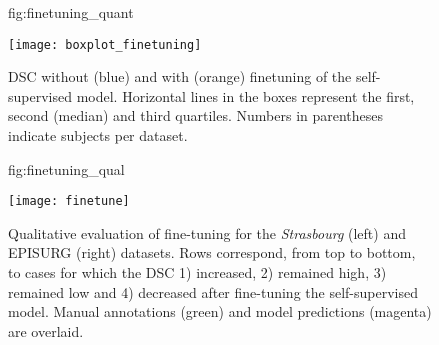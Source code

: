 

\begin{figure}
    \centering
    \floatconts
    {fig:finetuning_quant}
    {\caption{%
        \ac{DSC} without (blue) and with (orange) finetuning of the self-supervised model.
        Horizontal lines in the boxes represent the first, second (median) and third quartiles.
        Numbers in parentheses indicate subjects per dataset.
    }}
    {\texttt{[image: boxplot\_finetuning]}}
\end{figure}


\begin{figure}[ht!]
    \centering
    \floatconts
    {fig:finetuning_qual}
    {\caption{%
        Qualitative evaluation of fine-tuning for the \textit{Strasbourg} (left) and EPISURG (right) datasets.
        Rows correspond, from top to bottom, to cases for which the \ac{DSC}
        1) increased,
        2) remained high,
        3) remained low and
        4) decreased
        after fine-tuning the self-supervised model.
        Manual annotations (green) and model predictions (magenta) are overlaid.
    }}
    {\texttt{[image: finetune]}}
\end{figure}